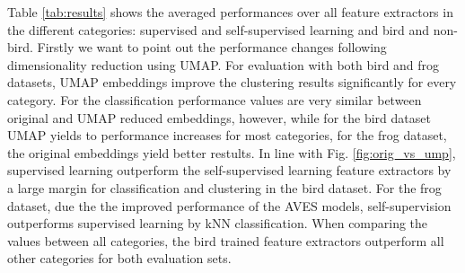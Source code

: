 Table \ref{tab:results} shows the averaged performances over all feature extractors in the different categories: supervised and self-supervised learning and bird and non-bird.
Firstly we want to point out the performance changes following dimensionality reduction using UMAP.
For evaluation with both bird and frog datasets, UMAP embeddings improve the clustering results significantly for every category.
For the classification performance values are very similar between original and UMAP reduced embeddings, however, while for the bird dataset UMAP yields to performance increases for most categories, for the frog dataset, the original embeddings yield better restults.
In line with Fig. \ref{fig:orig_vs_ump}, supervised learning outperform the self-supervised learning feature extractors by a large margin for classification and clustering in the bird dataset.
For the frog dataset, due the the improved performance of the AVES models, self-supervision outperforms supervised learning by kNN classification.
When comparing the values between all categories, the bird trained feature extractors outperform all other categories for both evaluation sets.
